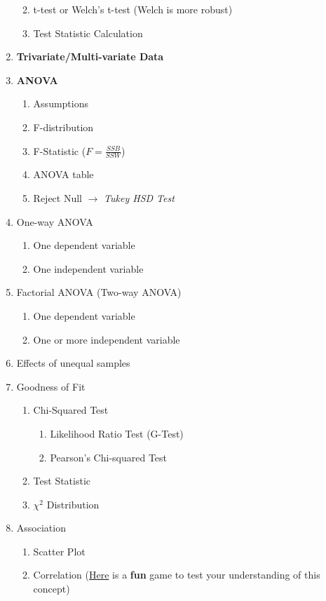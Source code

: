 \documentclass[11pt]{article}
\begin{document}
\begin{enumerate}
\begin{enumerate}
\begin{enumerate}
			\end{enumerate}
			\item t-test or Welch's t-test (Welch is more robust)
			\item Test Statistic Calculation
		\end{enumerate}
		\item \textbf{Trivariate/Multi-variate Data}
		\item \textbf{ANOVA}
		\begin{enumerate}
			\item Assumptions
			\item F-distribution
			\item F-Statistic ($F = \frac{SSB}{SSW}$)
			\item ANOVA table
			\item Reject Null $\to$ \textit{Tukey HSD Test}
		\end{enumerate}
		\item One-way ANOVA
		\begin{enumerate}
			\item One dependent variable
			\item One independent variable
		\end{enumerate}
		\item Factorial ANOVA (Two-way ANOVA)
		\begin{enumerate}
			\item One dependent variable
			\item One or more independent variable
		\end{enumerate}
		\item Effects of unequal samples
		\item Goodness of Fit
		\begin{enumerate}
			\item Chi-Squared Test
			\begin{enumerate}
				\item Likelihood Ratio Test (G-Test)
				\item Pearson's Chi-squared Test
			\end{enumerate}
			\item Test Statistic
			\item $\chi^2$ Distribution
		\end{enumerate}
		\item Association
		\begin{enumerate}
			\item Scatter Plot
			\item Correlation (\href{http://guessthecorrelation.com/}{Here} is a \textbf{fun} game to test your understanding of this concept)

\end{enumerate}
\end{enumerate}
\end{document}
